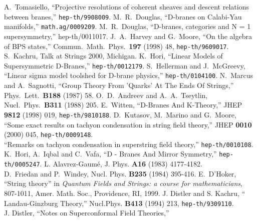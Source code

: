 \documentclass[a4paper,12pt]{article}
\begin{document}
\begin{thebibliography}{99}
A.~Tomasiello,
``Projective resolutions of coherent sheaves and descent relations
between branes,'' 
{\tt hep-th/9908009}. 
M.~R.~Douglas, ``D-branes on Calabi-Yau manifolds,''
{\tt math.ag/0009209}.
M.~R.~Douglas,
``D-branes, categories and N = 1 supersymmetry,''
hep-th/0011017.
 J.~A.~Harvey and G.~Moore, ``On the algebra of BPS
states,'' Commun.\ Math.\ Phys.\ {\bf 197} (1998) 48,
{\tt hep-th/9609017}.
 S.~Kachru, Talk at Strings 2000, Michigan.  
K.~Hori, ``Linear Models of Supersymmetric D-Branes,''
{\tt hep-th/0012179}.
S.~Hellerman and J.~McGreevy,
``Linear sigma model toolshed for D-brane physics,''
{\tt hep-th/0104100}.
N.~Marcus and A.~Sagnotti,
``Group Theory From 'Quarks' At The Ends Of Strings,''
Phys.\ Lett.\  {\bf B188} (1987) 58.
O.~D.~Andreev and A.~A.~Tseytlin,
Nucl.\ Phys.\  {\bf B311} (1988) 205.
 E.~Witten, ``D-Branes And K-Theory,'' JHEP
{\bf 9812} (1998) 019, {\tt hep-th/9810188}.
D.~Kutasov, M.~Marino and G.~Moore,
``Some exact results on tachyon condensation in string field theory,''
JHEP {\bf 0010} (2000) 045, 
{\tt hep-th/0009148}.  \\
``Remarks on tachyon condensation in superstring field theory,''
{\tt hep-th/0010108}. 
 K.~Hori, A.~Iqbal and C.~Vafa, ``D - Branes And Mirror
Symmetry,'' {\tt hep-th/0005247}.
 L. Alavrez-Gaum\'e, J. Phys. {\bf A16}
(1983) 4177-4182. \\
D.~Friedan and P.~Windey, Nucl. Phys. {\bf B235} (1984) 395-416.
 E.~D'Hoker, ``String theory'' in {\em Quantum Fields
and Strings: a course for mathematicians}, 807-1011, Amer. Math. Soc.,
Providence, RI, 1999.
 J. Distler and S. Kachru,  ``\coordHE{} Landau-Ginzburg
Theory,'' Nucl.Phys. {\bf B413} (1994) 213, {\tt hep-th/9309110}.\\
J. Distler, ``Notes on \coordHE{} Superconformal Field Theories,''

\end{thebibliography}
\end{document}
